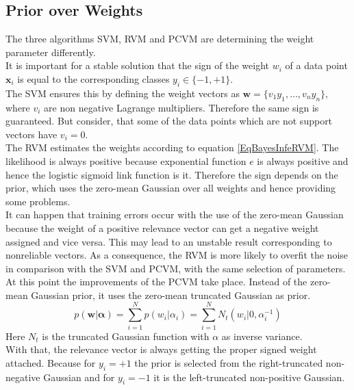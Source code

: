 \subsection{Prior over Weights}\label{PcSecWeights}
The three algorithms \acs{SVM}, \acs{RVM} and \acs{PCVM} are determining the weight parameter differently.\\
It is important for a stable solution that the sign of the weight $w_i$ of a data point $\mathbf{x}_i$ is equal to the corresponding classes $y_i \in\{-1,+1\}$.\cite{Chen.2009}\\
The \ac{SVM} ensures this by defining the weight vectors as $\mathbf{w} = \{v_1y_1,\dots,v_ny_n\}$, where $v_i$ are non negative Lagrange multipliers.
Therefore the same sign is guaranteed.\cite{Chen.2009}
But consider, that some of the data points which are not support vectors have $v_i=0$.\cite[p. 330]{Bishop.2009} \\
The \ac{RVM} estimates the weights according to equation \eqref{EqBayesInfeRVM}.
The likelihood is always positive because exponential function $e$ is always positive \cite[p. 355]{Hartmann.2015} and hence the logistic sigmoid link function is it.
Therefore the sign depends on the prior, which uses the zero-mean Gaussian over all weights and hence providing some problems.\\
It can happen that training errors occur with the use of the zero-mean Gaussian because the weight of a positive relevance vector can get a negative weight assigned and vice versa.
This may lead to an unstable result corresponding to nonreliable vectors.
As a consequence, the \acs{RVM} is more likely to overfit the noise in comparison with the \acs{SVM} and \acs{PCVM}, with the same selection of parameters.\cite{Chen.2009}\\
At this point the improvements of the \acs{PCVM} take place. 
Instead of the zero-mean Gaussian prior, it uses the zero-mean truncated Gaussian as prior. \cite{Chen.2009}
\begin{equation}\label{EqPcvmNtPrior}
p(\mathbf{w} \vert \boldsymbol{\alpha}) = \sum_{i=1}^{N}p(w_i \vert \alpha_i) = \sum_{i=1}^{N}N_t(w_i \vert 0,\alpha_i^{-1})
\end{equation}
Here $N_t$ is the truncated Gaussian function with $\alpha$ as inverse variance.\\
With that, the relevance vector is always getting the proper signed weight attached.
Because for $y_i=+1$ the prior is selected from the right-truncated non-negative Gaussian and for $y_i=-1$ it is the left-truncated non-positive Gaussian.\cite{Chen.2009}\\
